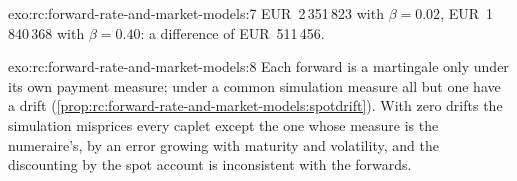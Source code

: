 \begin{solution}{exo:rc:forward-rate-and-market-models:7}
EUR~2\,351\,823 with $\beta=0.02$, EUR~1\,840\,368 with $\beta=0.40$: a difference of
EUR~511\,456.
\end{solution}

\begin{solution}{exo:rc:forward-rate-and-market-models:8}
Each forward is a martingale only under its own payment measure; under a common
simulation measure all but one have a drift
(\cref{prop:rc:forward-rate-and-market-models:spotdrift}). With zero drifts the
simulation misprices every caplet except the one whose measure is the
numeraire's, by an error growing with maturity and volatility, and the
discounting by the spot account is inconsistent with the forwards.
\end{solution}

